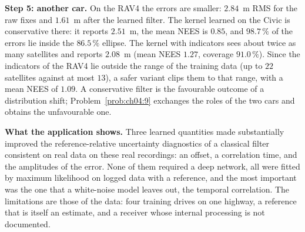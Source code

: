 \documentclass[graybox,envcountchap]{style/SNmono}
\providecommand{\DIFadd}[1]{{\protect\color{blue} #1}} %
\providecommand{\DIFdel}[1]{{\protect\color{red} #1}} %
\providecommand{\DIFaddbegin}{} %
\providecommand{\DIFaddend}{} %
\providecommand{\DIFdelbegin}{} %
\providecommand{\DIFdelend}{} %
\begin{document}
\textbf{Step 5: another car.} On the RAV4 the errors are smaller: $2.84$~m RMS for the raw fixes and $1.61$~m after the learned filter. The kernel learned on the Civic is conservative there: it reports $2.51$~m, the mean NEES is $0.85$, and $98.7\,\%$ of the errors lie inside the $86.5\,\%$ ellipse. The kernel with indicators sees about twice as many satellites and reports $2.08$~m (mean NEES $1.27$, coverage $91.0\,\%$). Since the indicators of the RAV4 lie outside the range of the training data (up to $22$ satellites against at most $13$), a safer variant clips them to that range, with a mean NEES of $1.09$. A conservative filter is the favourable outcome of a distribution shift; Problem~\ref{prob:ch04:9} exchanges the roles of the two cars and obtains the unfavourable one.

\textbf{What the application shows.} Three learned quantities \DIFdelbegin \DIFdel{made }\DIFdelend \DIFaddbegin \DIFadd{substantially improved the reference-relative uncertainty diagnostics of }\DIFaddend a classical filter \DIFdelbegin \DIFdel{consistent on real data}\DIFdelend \DIFaddbegin \DIFadd{on these real recordings}\DIFaddend : an offset, a correlation time, and the amplitudes of the error. None of them required a deep network, all were fitted by maximum likelihood on logged data with a reference, and the most important was the one that a white-noise model leaves out, the temporal correlation. The limitations are those of the data: four training drives on one highway, a reference that is itself an estimate, and a receiver whose internal processing is not documented.
\end{document}
